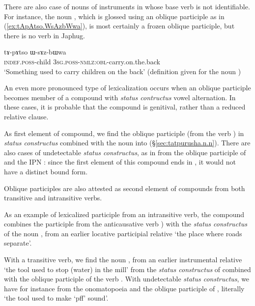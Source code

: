 There are also case of nouns of instruments in  whose base verb is not identifiable. For instance, the noun , which is glossed using an oblique participle as in (\ref{ex:tApAtso.WsAzbWwa}), is most certainly a frozen oblique participle, but there is no verb  in Japhug.

\begin{exe}
\ex \label{ex:tApAtso.WsAzbWwa}
\gll   tɤ-pɤtso ɯ-sɤz-bɯwa \\
\textsc{indef}.\textsc{poss}-child \textsc{3sg}.\textsc{poss}-\textsc{nmlz}:\textsc{obl}-carry.on.the.back \\
\glt `Something used to carry children on the back' (definition given for the noun )
\end{exe}

An even more pronounced type of lexicalization occurs when an oblique participle becomes member of a compound with \textit{status contructus} vowel alternation. In these cases, it is probable that the compound is genitival, rather than a reduced relative clause.

As first element of compound, we find the oblique participle  (from the verb ) in \textit{status constructus} combined with the noun  into 
 (§\ref{sec:tatpurusha.n.n}). There are also cases of undetectable \textit{status constructus}, as in  from the oblique participle of  and the IPN : since the first element of this compound  ends in , it would not have a distinct bound form.

Oblique participles are also attested as second element of compounds from both transitive and intransitive verbs. 

As an example of lexicalized participle from an intransitive verb, the compound  combines the participle  from the anticausative verb ) with the \textit{status constructus} of the noun , from an earlier locative participial relative  `the place where roads separate'. 

With a transitive verb, we find the noun , from an earlier instrumental relative  `the tool used to stop (water) in the mill' from the \textit{status constructus}  of  combined with the oblique participle  of the verb . With undetectable \textit{status constructus}, we have for instance  from the  onomatopoeia  and the oblique participle of , literally `the tool used to make `pff' sound'. 

